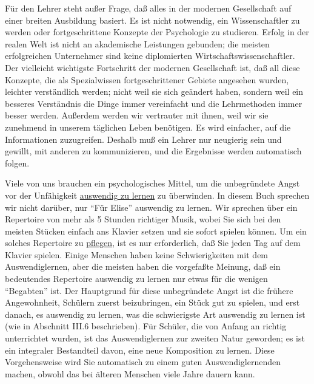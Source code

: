 Für den Lehrer steht außer Frage, daß alles in der modernen Gesellschaft auf einer breiten Ausbildung basiert.
Es ist nicht notwendig, ein Wissenschaftler zu werden oder fortgeschrittene Konzepte der Psychologie zu studieren.
Erfolg in der realen Welt ist nicht an akademische Leistungen gebunden; die meisten erfolgreichen Unternehmer sind keine diplomierten Wirtschaftswissenschaftler.
Der vielleicht wichtigste Fortschritt der modernen Gesellschaft ist, daß all diese Konzepte, die als Spezialwissen fortgeschrittener Gebiete angesehen wurden, leichter verständlich werden; nicht weil sie sich geändert haben, sondern weil ein besseres Verständnis die Dinge immer vereinfacht und die Lehrmethoden immer besser werden.
Außerdem werden wir vertrauter mit ihnen, weil wir sie zunehmend in unserem täglichen Leben benötigen.
Es wird einfacher, auf die Informationen zuzugreifen.
Deshalb muß ein Lehrer nur neugierig sein und gewillt, mit anderen zu kommunizieren, und die Ergebnisse werden automatisch folgen.

Viele von uns brauchen ein psychologisches Mittel, um die unbegründete Angst vor der Unfähigkeit \hyperref[c1iii6]{auswendig zu lernen} zu überwinden.
In diesem Buch sprechen wir nicht darüber, nur \enquote{Für Elise} auswendig zu lernen.
Wir sprechen über ein Repertoire von mehr als 5 Stunden richtiger Musik, wobei Sie sich bei den meisten Stücken einfach ans Klavier setzen und sie sofort spielen können.
Um ein solches Repertoire zu \hyperref[c1iii6k]{pflegen}, ist es nur erforderlich, daß Sie jeden Tag auf dem Klavier spielen.
Einige Menschen haben keine Schwierigkeiten mit dem Auswendiglernen, aber die meisten haben die vorgefaßte Meinung, daß ein bedeutendes Repertoire auswendig zu lernen nur etwas für die wenigen \enquote{Begabten} ist.
Der Hauptgrund für diese unbegründete Angst ist die frühere Angewohnheit, Schülern zuerst beizubringen, ein Stück gut zu spielen, und erst danach, es auswendig zu lernen, was die schwierigste Art auswendig zu lernen ist (wie in Abschnitt III.6 beschrieben).
Für Schüler, die von Anfang an richtig unterrichtet wurden, ist das Auswendiglernen zur zweiten Natur geworden; es ist ein integraler  Bestandteil davon, eine neue Komposition zu lernen.
Diese Vorgehensweise wird Sie automatisch zu einem guten Auswendiglernenden machen, obwohl das bei älteren Menschen viele Jahre dauern kann.

